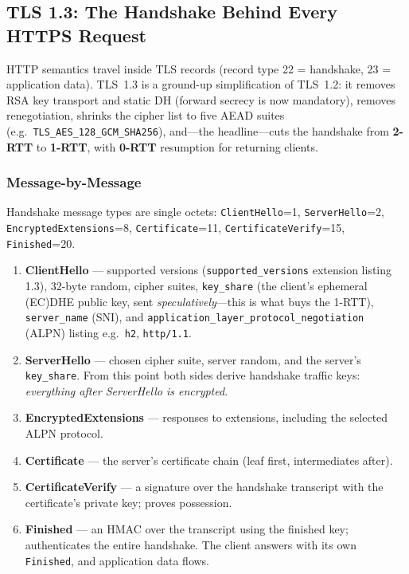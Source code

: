 \subsection{TLS 1.3: The Handshake Behind Every HTTPS Request}

HTTP semantics travel inside TLS records (record type 22 = handshake, 23 = application data). TLS~1.3 \cite{rfc8446} is a ground-up simplification of TLS~1.2: it removes RSA key transport and static DH (forward secrecy is now mandatory), removes renegotiation, shrinks the cipher list to five AEAD suites (e.g.\ \texttt{TLS\_AES\_128\_GCM\_SHA256}), and---the headline---cuts the handshake from \textbf{2-RTT} to \textbf{1-RTT}, with \textbf{0-RTT} resumption for returning clients.

\subsubsection{Message-by-Message}

Handshake message types are single octets: \texttt{ClientHello}=1, \texttt{ServerHello}=2, \texttt{EncryptedExtensions}=8, \texttt{Certificate}=11, \texttt{CertificateVerify}=15, \texttt{Finished}=20.

\begin{enumerate}
  \item \textbf{ClientHello} --- supported versions (\texttt{supported\_versions} extension listing 1.3), 32-byte random, cipher suites, \texttt{key\_share} (the client's ephemeral (EC)DHE public key, sent \emph{speculatively}---this is what buys the 1-RTT), \texttt{server\_name} (SNI), and \texttt{application\_layer\_protocol\_negotiation} (ALPN) listing e.g.\ \texttt{h2}, \texttt{http/1.1}.
  \item \textbf{ServerHello} --- chosen cipher suite, server random, and the server's \texttt{key\_share}. From this point both sides derive handshake traffic keys: \emph{everything after ServerHello is encrypted}.
  \item \textbf{EncryptedExtensions} --- responses to extensions, including the selected ALPN protocol.
  \item \textbf{Certificate} --- the server's certificate chain (leaf first, intermediates after).
  \item \textbf{CertificateVerify} --- a signature over the handshake transcript with the certificate's private key; proves possession.
  \item \textbf{Finished} --- an HMAC over the transcript using the finished key; authenticates the entire handshake. The client answers with its own \texttt{Finished}, and application data flows.
\end{enumerate}

